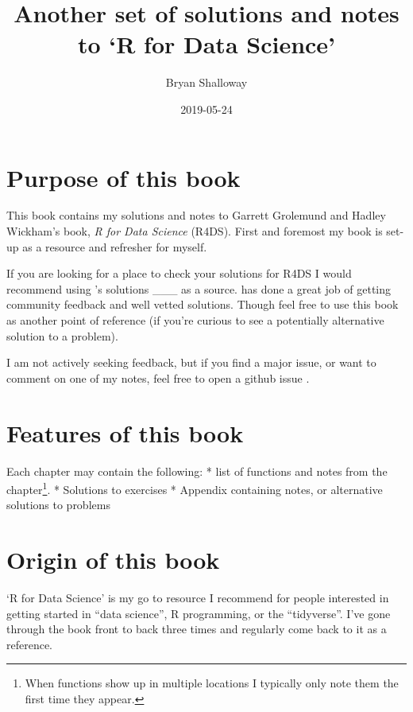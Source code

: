 \documentclass[]{book}
\title{Another set of solutions and notes to `R for Data Science'}
\author{Bryan Shalloway}
\date{2019-05-24}
\let\rmarkdownfootnote\footnote%
\def\footnote{\protect\rmarkdownfootnote}
\theoremstyle{definition}
\theoremstyle{definition}
\theoremstyle{definition}
\theoremstyle{remark}
\begin{document}
\maketitle

{
\setcounter{tocdepth}{1}
\tableofcontents
}
\hypertarget{purpose-of-this-book}{%
\chapter{Purpose of this book}\label{purpose-of-this-book}}

This book contains my solutions and notes to Garrett Grolemund and
Hadley Wickham's book, \emph{R for Data Science} (R4DS). First and
foremost my book is set-up as a resource and refresher for myself.

If you are looking for a place to check your solutions for R4DS I would
recommend using \citet{Jrnold}'s solutions \_\_\_ as a source.
\citet{Jrnold} has done a great job of getting community feedback and
well vetted solutions. Though feel free to use this book as another
point of reference (if you're curious to see a potentially alternative
solution to a problem).

I am not actively seeking feedback, but if you find a major issue, or
want to comment on one of my notes, feel free to open a github issue
\citet{brshallo}.

\hypertarget{features-of-this-book}{%
\chapter{Features of this book}\label{features-of-this-book}}

Each chapter may contain the following: * list of functions and notes
from the chapter\footnote{When functions show up in multiple locations I
  typically only note them the first time they appear.}. * Solutions to
exercises * Appendix containing notes, or alternative solutions to
problems

\hypertarget{origin-of-this-book}{%
\chapter{Origin of this book}\label{origin-of-this-book}}

`R for Data Science' is my go to resource I recommend for people
interested in getting started in ``data science'', R programming, or the
``tidyverse''. I've gone through the book front to back three times and
regularly come back to it as a reference.
\end{document}
